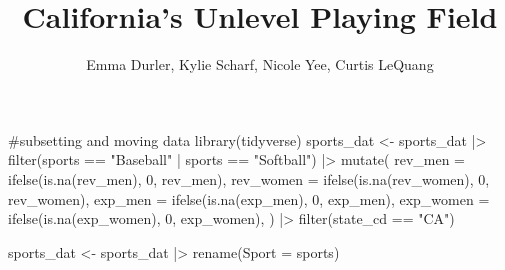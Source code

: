 \documentclass[
  letterpaper,
  DIV=11,
  numbers=noendperiod]{scrartcl}
\title{California's Unlevel Playing Field}
\author{Emma Durler, Kylie Scharf, Nicole Yee, Curtis LeQuang}
\date{}
\newenvironment{Shaded}{\begin{snugshade}}{\end{snugshade}}
\newcommand{\AttributeTok}[1]{\textcolor[rgb]{0.40,0.45,0.13}{#1}}
\newcommand{\CommentTok}[1]{\textcolor[rgb]{0.37,0.37,0.37}{#1}}
\newcommand{\DecValTok}[1]{\textcolor[rgb]{0.68,0.00,0.00}{#1}}
\newcommand{\FunctionTok}[1]{\textcolor[rgb]{0.28,0.35,0.67}{#1}}
\newcommand{\NormalTok}[1]{\textcolor[rgb]{0.00,0.23,0.31}{#1}}
\newcommand{\OtherTok}[1]{\textcolor[rgb]{0.00,0.23,0.31}{#1}}
\newcommand{\SpecialCharTok}[1]{\textcolor[rgb]{0.37,0.37,0.37}{#1}}
\newcommand{\StringTok}[1]{\textcolor[rgb]{0.13,0.47,0.30}{#1}}
\renewcommand*\contentsname{Table of contents}
\newcommand\contentsname{Table of contents}
\begin{document}
\maketitle

\renewcommand*\contentsname{Table of contents}
{
\hypersetup{linkcolor=}
\setcounter{tocdepth}{3}
\tableofcontents
}
\begin{Shaded}
\end{Shaded}

\begin{Shaded}
\begin{Highlighting}[]
\CommentTok{\#subsetting and moving data}
\FunctionTok{library}\NormalTok{(tidyverse)}
\NormalTok{sports\_dat }\OtherTok{\textless{}{-}}\NormalTok{ sports\_dat }\SpecialCharTok{|\textgreater{}}
  \FunctionTok{filter}\NormalTok{(sports }\SpecialCharTok{==} \StringTok{"Baseball"} \SpecialCharTok{|}\NormalTok{ sports }\SpecialCharTok{==} \StringTok{"Softball"}\NormalTok{) }\SpecialCharTok{|\textgreater{}}
  \FunctionTok{mutate}\NormalTok{(}
    \AttributeTok{rev\_men =} \FunctionTok{ifelse}\NormalTok{(}\FunctionTok{is.na}\NormalTok{(rev\_men), }\DecValTok{0}\NormalTok{, rev\_men),}
    \AttributeTok{rev\_women =} \FunctionTok{ifelse}\NormalTok{(}\FunctionTok{is.na}\NormalTok{(rev\_women), }\DecValTok{0}\NormalTok{, rev\_women),}
    \AttributeTok{exp\_men =} \FunctionTok{ifelse}\NormalTok{(}\FunctionTok{is.na}\NormalTok{(exp\_men), }\DecValTok{0}\NormalTok{, exp\_men),}
    \AttributeTok{exp\_women =} \FunctionTok{ifelse}\NormalTok{(}\FunctionTok{is.na}\NormalTok{(exp\_women), }\DecValTok{0}\NormalTok{, exp\_women),}
\NormalTok{  ) }\SpecialCharTok{|\textgreater{}}
  \FunctionTok{filter}\NormalTok{(state\_cd }\SpecialCharTok{==} \StringTok{"CA"}\NormalTok{) }

\NormalTok{sports\_dat }\OtherTok{\textless{}{-}}\NormalTok{ sports\_dat }\SpecialCharTok{|\textgreater{}}
  \FunctionTok{rename}\NormalTok{(}\AttributeTok{Sport =}\NormalTok{ sports)}
\end{Highlighting}
\end{Shaded}
\end{document}
